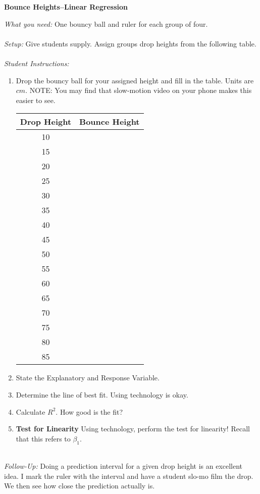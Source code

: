 \documentclass[12pt]{amsart}
\theoremstyle{definition}
\begin{document}
      \begin{framed}
      	\begin{center} \textbf{Bounce Heights--Linear Regression} \end{center}
      	\emph{What you need:} One bouncy ball and ruler for each group of four.\\
      	~\\
      	\emph{Setup:} Give students supply. Assign groups drop heights from the following table.\\
      	~\\
      	\emph{Student Instructions:} 
      	\begin{enumerate}
      		\item Drop the bouncy ball for your assigned height and fill in the table. Units are $cm$. NOTE: You may find that slow-motion video on your phone makes this easier to see.
      	
      	\begin{center}
      		\begin{tabular}{|c|c|}
      			\hline
      			Drop Height & Bounce Height \\
      			\hline
      			10 & \\
      			\hline
      			15 & \\
      			\hline
      			20 & \\
      			\hline
      			25 & \\
      			\hline
      			30 & \\
      			\hline
      			35 & \\
      			\hline
      			40 & \\
      			\hline
      			45 & \\
      			\hline
      			50 & \\
      			\hline
      			55 & \\
      			\hline
      			60 & \\
      			\hline
      			65 & \\
      			\hline
      			70 & \\
      			\hline
      			75 & \\
      			\hline
      			80 & \\
      			\hline
      			85 & \\
      			\hline
      		\end{tabular}
      	\end{center}
      			\item State the Explanatory and Response Variable.
      			\item Determine the line of best fit. Using technology is okay.
      			\item Calculate $R^2$. How good is the fit?
      			\item \textbf{Test for Linearity} Using technology, perform the test for linearity! Recall that this refers to $\beta_1$.
      	\end{enumerate}
      	~\\
      	\emph{Follow-Up:} Doing a prediction interval for a given drop height is an excellent idea. I mark the ruler with the interval and have a student slo-mo film the drop. We then see how close the prediction actually is.
      \end{framed}
 
\end{document}
